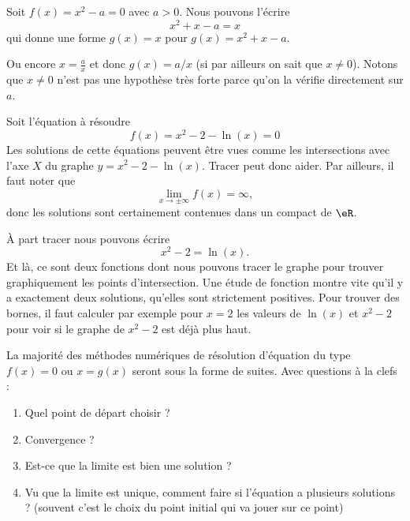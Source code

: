 \begin{example}
	Soit \( f(x)=x^2-a=0\) avec \( a>0\). Nous pouvons l'écrire
	\begin{equation}
		x^2+x-a=x
	\end{equation}
	qui donne une forme \( g(x)=x\) pour \( g(x)=x^2+x-a\).

	Ou encore \( x=\frac{ a }{ x }\) et donc \( g(x)=a/x\) (si par ailleurs on sait que \( x\neq 0\)). Notons que \( x\neq 0\) n'est pas une hypothèse très forte parce qu'on la vérifie directement sur \( a\).
\end{example}

\begin{example}
	Soit l'équation à résoudre
	\begin{equation}
		f(x)=x^2-2-\ln(x)=0
	\end{equation}
	Les solutions de cette équations peuvent être vues comme les intersections avec l'axe \( X\) du graphe \( y=x^2-2-\ln(x)\). Tracer peut donc aider. Par ailleurs, il faut noter que
	\begin{equation}
		\lim_{x\to \pm\infty} f(x)=\infty,
	\end{equation}
	donc les solutions sont certainement contenues dans un compact de \( \eR\).

	À part tracer nous pouvons écrire
	\begin{equation}
		x^2-2=\ln(x).
	\end{equation}
	Et là, ce sont deux fonctions dont nous pouvons tracer le graphe pour trouver graphiquement les points d'intersection. Une étude de fonction montre vite qu'il y a exactement deux solutions, qu'elles sont strictement positives. Pour trouver des bornes, il faut calculer par exemple pour \( x=2\) les valeurs de \( \ln(x)\) et \( x^2-2\) pour voir si le graphe de \( x^2-2\) est déjà plus haut.
\end{example}

La majorité des méthodes numériques de résolution d'équation du type \( f(x)=0\) ou \( x=g(x)\) seront sous la forme de suites. Avec questions à la clefs :
\begin{enumerate}
	\item
		Quel point de départ choisir ?
	\item
		Convergence ?
	\item
		Est-ce que la limite est bien une solution ?
	\item
		Vu que la limite est unique, comment faire si l'équation a plusieurs solutions ? (souvent c'est le choix du point initial qui va jouer sur ce point)
\end{enumerate}

